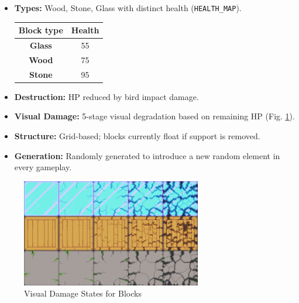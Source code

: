 \documentclass[11pt, a4paper]{article}
\begin{document}
\begin{itemize}

    \item \textbf{Types:} Wood, Stone, Glass with distinct health (\texttt{HEALTH\_MAP}).
    
    \begin{center}
        
        \begin{tabular}{|c|c|}
    
            \hline
            \textbf{Block type} & \textbf{Health} \\
            \hline
            \textbf{Glass} & 55\\
            \hline
            \textbf{Wood} & 75\\
            \hline
            \textbf{Stone} & 95\\
            \hline
        
        \end{tabular}
    
    \end{center}
    
    \item \textbf{Destruction:} HP reduced by bird impact damage.
    
    \item \textbf{Visual Damage:} 5-stage visual degradation based on remaining HP (Fig. \ref{fig:block_damage_a}).
    
    \item \textbf{Structure:} Grid-based; blocks currently float if support is removed.
    
    \item \textbf{Generation:} Randomly generated to introduce a new random element in every gameplay.

\end{itemize}

\begin{figure}[h!]

    \centering
    
    \includegraphics[width=0.7\textwidth]{images/block_damage.png}
    
    \caption{Visual Damage States for Blocks}
    
    \label{fig:block_damage_a}

\end{figure}
\end{document}
